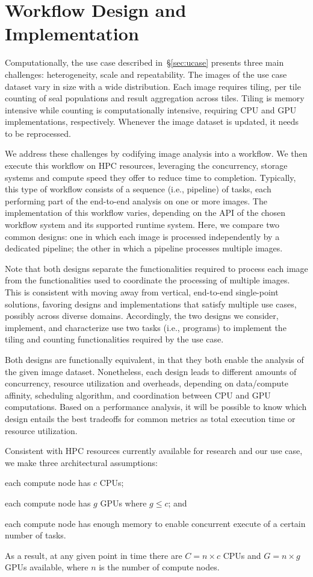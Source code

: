 \section{Workflow Design and Implementation}\label{sec:design}
Computationally, the use case described in~\S\ref{sec:ucase} presents three main challenges: heterogeneity, scale and repeatability.
The images of the use case dataset vary in size with a wide distribution.
Each image requires tiling, per tile counting of seal populations and result aggregation across tiles.
Tiling is memory intensive while counting is computationally intensive, requiring CPU and GPU implementations, respectively.
Whenever the image dataset is updated, it needs to be reprocessed.

We address these challenges by codifying image analysis into a workflow.
We then execute this workflow on HPC resources, leveraging the concurrency, storage systems and compute speed they offer to reduce time to completion.
Typically, this type of workflow consists of a sequence (i.e., pipeline) of tasks, each performing part of the end-to-end analysis on one or more images.
The implementation of this workflow varies, depending on the API of the chosen workflow system and its supported runtime system.
Here, we compare two common designs: one in which each image is processed independently by a dedicated pipeline; the other in which a pipeline processes multiple images.

Note that both designs separate the functionalities required to process each image from the functionalities used to coordinate the processing of multiple images.
This is consistent with moving away from vertical, end-to-end single-point solutions, favoring designs and implementations that satisfy multiple use cases, possibly across diverse domains.
Accordingly, the two designs we consider, implement, and characterize use two tasks (i.e., programs) to implement the tiling and counting functionalities required by the use case.

Both designs are functionally equivalent, in that they both enable the analysis of the given image dataset.
Nonetheless, each design leads to different amounts of concurrency, resource utilization and overheads, depending on data/compute affinity, scheduling algorithm, and coordination between CPU and GPU computations.
Based on a performance analysis, it will be possible to know which design entails the best tradeoffs for common metrics as total execution time or resource utilization.

Consistent with HPC resources currently available for research and our use case, we make three architectural assumptions: 
\begin{inparaenum}[(1)]
    \item each compute node has $c$ CPUs;
    \item each compute node has $g$ GPUs where $g \le c$; and
    \item each compute node has enough memory to enable concurrent execute of a certain number of tasks.
\end{inparaenum}
As a result, at any given point in time there are $C = n\times c$ CPUs and $G = n\times g$ GPUs available, where $n$ is the number of compute nodes.

